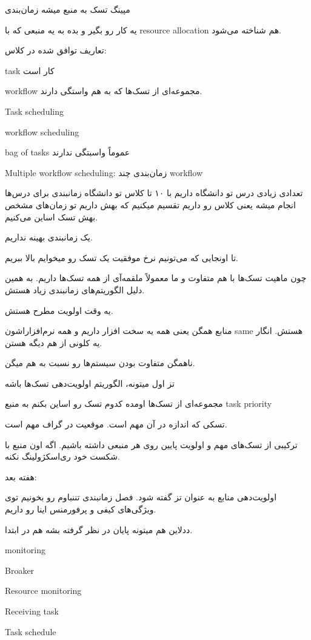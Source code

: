 \documentclass[a4paper]{article}
\begin{document}
مپینگ تسک به منبع میشه زمان‌بندی

یه کار رو بگیر و بده به یه منبعی که با resource allocation هم شناخته می‌شود.

تعاریف توافق شده در کلاس:

task کار است

workflow مجموعه‌ای از تسک‌ها که به هم واستگی دارند. 

Task scheduling

workflow scheduling

bag of tasks عموماً واسبتگی ندارند

Multiple workflow scheduling: زمان‌بندی چند workflow

تعدادی زیادی درس تو دانشگاه داریم با ۱۰ تا کلاس تو دانشگاه زمانبندی برای درس‌ها
انجام میشه یعنی کلاس رو داریم تقسیم میکنیم که بهش داریم تو زمان‌های مشخص بهش تسک
اساین می‌کنیم.

یک زمانبندی بهینه نداریم.

تا اونجایی که می‌تونیم نرخ موفقیت یک تسک رو میخوایم بالا ببریم.

چون ماهیت تسک‌ها با هم متفاوت و ما معمولاً ملقمه‌آی از همه تسک‌ها داریم. به همین
دلیل الگوریتم‌های زمانبندی زیاد هستش.

یه وقت اولویت مطرح هستش.

منابع همگن یعنی همه یه سخت افزار‌ داریم و همه نرم‌افزاراشون same هستش. انگار یه
کلونی از هم دیگه هستن.

ناهمگن متفاوت بودن سیستم‌ها رو نسبت به هم میگن.

تز اول میتونه، الگوریتم اولویت‌دهی تسک‌ها باشه

مجموعه‌ای از تسک‌ها اومده کدوم تسک رو اساین بکنم به منبع task priority

تسکی که اندازه در آن مهم است. موقعیت در گراف مهم است.

ترکیبی از تسک‌های مهم و اولویت پایین روی هر منبعی داشته باشیم. اگه اون منبع با
شکست خود ری‌اسکژولینگ نکنه.

هفته بعد:

اولویت‌دهی منابع به عنوان تز گفته شود. فصل زمانبندی تننباوم رو بخونیم توی
ویژگی‌های کیفی و پرفورمنس اینا رو داریم.

ددلاین هم میتونه پایان در نظر گرفته بشه هم در ابتدا.


monitoring

Broaker

Resource monitoring

Receiving task

Task schedule

\newpage


\end{document}
